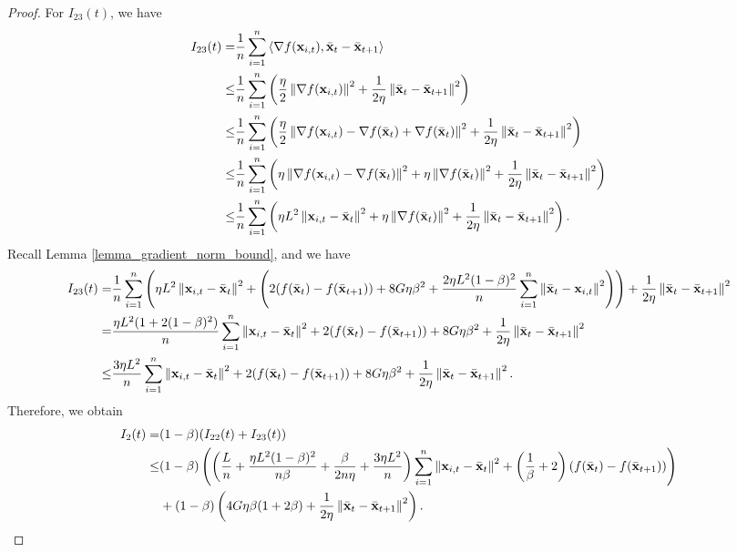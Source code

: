 \documentclass{article}
\begin{document}
\begin{proof}
For $I_{23}(t)$, we have
\begin{align}
\nonumber
I_{23}(t) = & \frac{1}{n}\sum_{i=1}^n\left\langle\nabla f({\bf x}_{i,t}), \bar{{\bf x}}_t - \bar{{\bf x}}_{t+1}  \right\rangle \\ \nonumber
\le & \frac{1}{n}\sum_{i=1}^n\left( \frac{\eta}{2}\left\lVert\nabla f({\bf x}_{i,t})\right\rVert^2 + \frac{1}{2\eta} \left\lVert \bar{{\bf x}}_t - \bar{{\bf x}}_{t+1}\right\rVert^2  \right) \\ \nonumber
\le & \frac{1}{n}\sum_{i=1}^n\left( \frac{\eta}{2}\left\lVert\nabla f({\bf x}_{i,t}) - \nabla f(\bar{{\bf x}}_t) + \nabla f(\bar{{\bf x}}_t)\right\rVert^2 + \frac{1}{2\eta} \left\lVert \bar{{\bf x}}_t - \bar{{\bf x}}_{t+1}\right\rVert^2  \right) \\ \nonumber
\le & \frac{1}{n}\sum_{i=1}^n\left(  \eta\left\lVert\nabla f({\bf x}_{i,t}) - \nabla f(\bar{{\bf x}}_t)\right\rVert^2 + \eta \left\lVert\nabla f(\bar{{\bf x}}_t)\right\rVert^2 + \frac{1}{2\eta} \left\lVert \bar{{\bf x}}_t - \bar{{\bf x}}_{t+1}\right\rVert^2  \right) \\ \nonumber
\le & \frac{1}{n}\sum_{i=1}^n\left(  \eta L^2 \left\lVert{\bf x}_{i,t} - \bar{{\bf x}}_t\right\rVert^2 + \eta \left\lVert\nabla f(\bar{{\bf x}}_t)\right\rVert^2 + \frac{1}{2\eta} \left\lVert \bar{{\bf x}}_t - \bar{{\bf x}}_{t+1}\right\rVert^2  \right).
\end{align} Recall Lemma \ref{lemma_gradient_norm_bound}, and we have
\begin{align}
\nonumber
I_{23}(t) = & \frac{1}{n}\sum_{i=1}^n\left(  \eta L^2 \left\lVert{\bf x}_{i,t} - \bar{{\bf x}}_t\right\rVert^2 + \left(  2(f(\bar{{\bf x}}_t) - f(\bar{{\bf x}}_{t+1})) + 8G\eta\beta^2 +  \frac{2\eta L^2(1-\beta)^2}{n}\sum_{i=1}^n\left\lVert\bar{{\bf x}}_t - {\bf x}_{i,t} \right\rVert^2  \right)  \right)  + \frac{1}{2\eta} \left\lVert \bar{{\bf x}}_t - \bar{{\bf x}}_{t+1}\right\rVert^2 \\ \nonumber
= & \frac{\eta L^2(1+2(1-\beta)^2)}{n}\sum_{i=1}^n \left\lVert{\bf x}_{i,t} - \bar{{\bf x}}_t\right\rVert^2 + 2(f(\bar{{\bf x}}_t) - f(\bar{{\bf x}}_{t+1})) + 8G\eta\beta^2 + \frac{1}{2\eta} \left\lVert \bar{{\bf x}}_t - \bar{{\bf x}}_{t+1}\right\rVert^2 \\ \nonumber
\le & \frac{3\eta L^2}{n}\sum_{i=1}^n \left\lVert{\bf x}_{i,t} - \bar{{\bf x}}_t\right\rVert^2 + 2(f(\bar{{\bf x}}_t) - f(\bar{{\bf x}}_{t+1})) + 8G\eta\beta^2 + \frac{1}{2\eta} \left\lVert \bar{{\bf x}}_t - \bar{{\bf x}}_{t+1}\right\rVert^2.
\end{align} Therefore, we obtain
\begin{align}
\nonumber
I_2(t) = & (1-\beta)(I_{22}(t) + I_{23}(t)) \\ \nonumber
\le & (1-\beta) \left(  \left(  \frac{L}{n} + \frac{\eta L^2(1-\beta)^2}{n\beta} + \frac{\beta}{2n\eta} + \frac{3\eta L^2}{n}  \right)\sum_{i=1}^n\left\lVert{\bf x}_{i,t} - \bar{{\bf x}}_t \right\rVert^2 + \left( \frac{1}{\beta} + 2 \right)\left( f(\bar{{\bf x}}_t) - f(\bar{{\bf x}}_{t+1}) \right)  \right)\\ \nonumber 
&+ (1-\beta) \left(  4G\eta\beta(1 + 2\beta) +  \frac{1}{2\eta} \left\lVert \bar{{\bf x}}_t - \bar{{\bf x}}_{t+1}\right\rVert^2  \right).
\end{align}






\end{proof}
\end{document}
